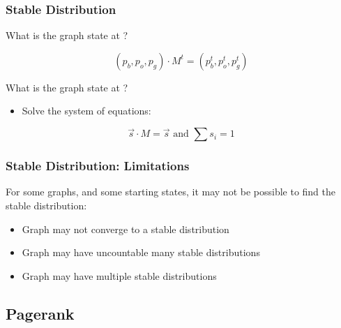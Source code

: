 \documentclass{beamer}
\begin{document}
\begin{frame}
  \frametitle{Stable Distribution}

  {\larger

    What is the graph state at ?
    
    \begin{equation*}
      (p_b,p_o,p_g)\cdot M^t = (p_b^t,p_o^t,p_g^t)
    \end{equation*}
    
    \vfill
    
    What is the graph state at ?
    
    \medskip

    \begin{itemize}
      \item Solve the system of equations:
    \end{itemize}
    \begin{equation*}
      \overrightarrow{s}\cdot M = \overrightarrow{s} \text{ and } \sum{s_i} = 1
    \end{equation*}
  }
\end{frame}

\begin{frame}
  \frametitle{Stable Distribution: Limitations}

  {\larger

    For some graphs, and some starting states, it may not be
    possible to find the stable distribution:

    \bigskip
    
    \begin{itemize}
    \item Graph may not converge to a stable distribution
      \bigskip

    \item Graph may have uncountable many stable distributions
      \bigskip

    \item Graph may have multiple stable distributions
    \end{itemize}

  }
\end{frame}


\subsection{Pagerank}
\end{document}
